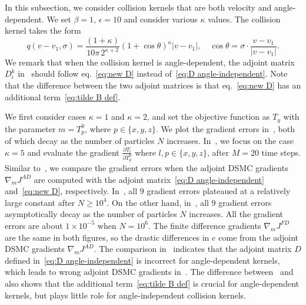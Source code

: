 \documentclass[12pt,nopreprintline]{elsarticle}
\begin{document}
In this subsection, we consider collision kernels that are both velocity and angle-dependent. We set $\beta=1$,  $\epsilon=10$ and consider various $\kappa$ values.   The collision kernel takes the form 
$$q(v-v_1,\sigma) = \frac{ (1+\kappa) }{10 \pi \, 2^{\kappa+2} }(1+\cos{\theta})^\kappa |v-v_1|,\quad \cos \theta  = \sigma \cdot \frac{v-v_1}{|v-v_1|}.$$
We remark that when the collision kernel is angle-dependent, the adjoint matrix $D_i^k$ in~ should follow eq.~\eqref{eq:new D} instead of~\cref{eq:D angle-independent}.  Note that the difference between the two adjoint matrices is that eq.~\eqref{eq:new D} has an additional term~\eqref{eq:tilde B def}.

We  first consider cases $\kappa=1$ and $\kappa = 2$, and set the objective function as $T_y$ with the parameter $m= T^0_p$,  where $p \in \{x,y,z\}$.  We plot the gradient errors in~,  both of which decay as the number of particles $N$ increases. In~, we focus on the case $\kappa = 5$ and evaluate the gradient $\frac{\partial T_l}{ \partial T^0_p}$ where $l,p\in\{x,y,z\}$, after $M=20$ time steps.   Similar to~,  we compare the gradient errors when the adjoint DSMC gradients $\nabla_m J^{AD}$ are computed with the adjoint matrix~\eqref{eq:D angle-independent} and~\eqref{eq:new D}, respectively.  In~, all $9$ gradient errors plateaued at a relatively large constant after $N\geq 10^4$.  On the other hand,  in~,  all $9$ gradient errors asymptotically decay as the number of particles $N$ increases. All the gradient errors are about $1\times 10^{-5}$ when $N = 10^6$.  The finite difference gradients $\nabla_m J^{FD}$ are the same in both figures,  so the drastic differences in $e$ come from the adjoint DSMC gradients $\nabla_m J^{AD}$. The comparison in~ indicates that the adjoint matrix $D$ defined in~\eqref{eq:D angle-independent} is incorrect for angle-dependent kernels,  which leads to wrong adjoint DSMC gradients in~. The difference between~ and~ also shows that the additional term~\eqref{eq:tilde B def} is crucial for angle-dependent kernels, but plays little role for angle-independent collision kernels.
\end{document}
